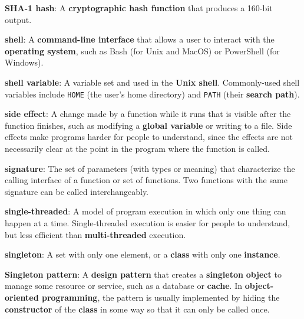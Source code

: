 \documentclass[krantzl]{krantz}
\newcommand{\glosskey}[1]{\textbf{#1}}
\begin{document}
\noindent \textbf{{\newline}\glosskey{SHA-1 hash}}: 
A \glosskey{cryptographic hash function} that produces a 160-bit output.


\noindent \textbf{{\newline}\glosskey{shell}}: 
A \glosskey{command-line interface} that allows a user to interact with the \glosskey{operating system}, such as Bash (for Unix and MacOS) or PowerShell (for Windows).


\noindent \textbf{{\newline}\glosskey{shell variable}}: 
A variable set and used in the \glosskey{Unix shell}. Commonly-used shell variables include \texttt{HOME} (the user’s home directory) and \texttt{PATH} (their \glosskey{search path}).


\noindent \textbf{{\newline}\glosskey{side effect}}: 
A change made by a function while it runs that is visible after the function finishes, such as modifying a \glosskey{global variable} or writing to a file. Side effects make programs harder for people to understand, since the effects are not necessarily clear at the point in the program where the function is called.


\noindent \textbf{{\newline}\glosskey{signature}}: 
The set of parameters (with types or meaning) that characterize the calling interface of a function or set of functions. Two functions with the same signature can be called interchangeably.


\noindent \textbf{{\newline}\glosskey{single-threaded}}: 
A model of program execution in which only one thing can happen at a time. Single-threaded execution is easier for people to understand, but less efficient than \glosskey{multi-threaded} execution.


\noindent \textbf{{\newline}\glosskey{singleton}}: 
A set with only one element, or a \glosskey{class} with only one \glosskey{instance}.


\noindent \textbf{{\newline}\glosskey{Singleton pattern}}: 
A \glosskey{design pattern} that creates a \glosskey{singleton} \glosskey{object} to manage some resource or service, such as a database or \glosskey{cache}. In \glosskey{object-oriented programming}, the pattern is usually implemented by hiding the \glosskey{constructor} of the \glosskey{class} in some way so that it can only be called once.
\end{document}
